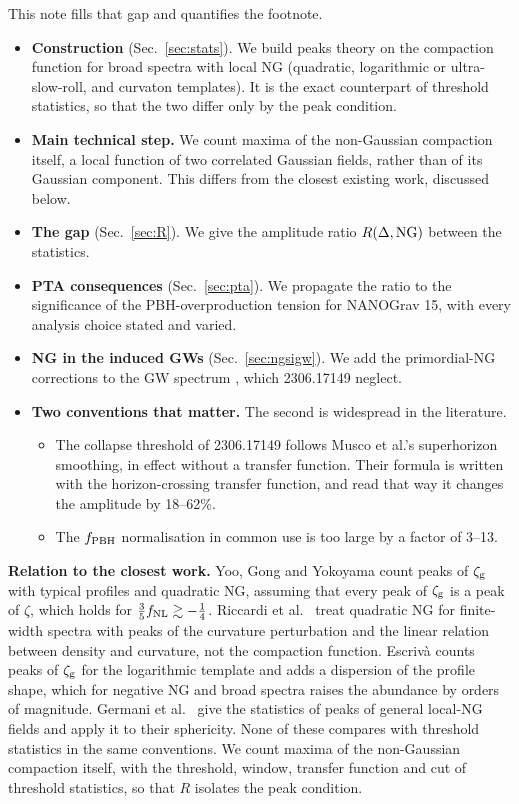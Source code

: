 \documentclass[11pt,a4paper]{article}
\newcommand{\zg}{\zeta_{\rm g}}
\newcommand{\fnl}{f_{\rm NL}}
\newcommand{\fpbh}{f_{\rm PBH}}
\begin{document}
This note fills that gap and quantifies the footnote.
\begin{itemize}
\item \textbf{Construction} (Sec.~\ref{sec:stats}). We build peaks theory on the compaction
function for broad spectra with local NG (quadratic, logarithmic or ultra-slow-roll, and
curvaton templates). It is the exact counterpart of threshold statistics, so that the two differ
only by the peak condition.
\item \textbf{Main technical step.} We count maxima of the non-Gaussian compaction itself, a local
function of two correlated Gaussian fields, rather than of its Gaussian component. This differs
from the closest existing work, discussed below.
\item \textbf{The gap} (Sec.~\ref{sec:R}). We give the amplitude ratio $R(\Delta,{\rm NG})$ between
the statistics.
\item \textbf{PTA consequences} (Sec.~\ref{sec:pta}). We propagate the ratio to the significance
of the PBH-overproduction tension for NANOGrav 15, with every analysis choice stated and varied.
\item \textbf{NG in the induced GWs} (Sec.~\ref{sec:ngsigw}). We add the primordial-NG corrections to
the GW spectrum \cite{CPS19,Unal19,ALW21}, which 2306.17149 neglect.
\item \textbf{Two conventions that matter.} The second is widespread in the literature.
  \begin{itemize}
  \item The collapse threshold of 2306.17149 follows Musco et al.'s superhorizon smoothing, in
  effect without a transfer function. Their formula is written with the horizon-crossing transfer
  function, and read that way it changes the amplitude by 18--62\%.
  \item The $\fpbh$ normalisation in common use is too large by a factor of 3--13.
  \end{itemize}
\end{itemize}

\textbf{Relation to the closest work.} Yoo, Gong and Yokoyama \cite{YGY19} count peaks of $\zg$
with typical profiles and quadratic NG, assuming that every peak of $\zg$ is a peak of $\zeta$,
which holds for $\frac35\fnl\gtrsim-\frac14$. Riccardi et al.\ \cite{Riccardi} treat quadratic NG
for finite-width spectra with peaks of the curvature perturbation and the linear relation between
density and curvature, not the compaction function. Escriv\`a \cite{Escriva26} counts peaks of
$\zg$ for the logarithmic template and adds a dispersion of the profile shape, which for negative
NG and broad spectra raises the abundance by orders of magnitude. Germani et al.\ \cite{Germani25}
give the statistics of peaks of general local-NG fields and apply it to their sphericity. None of
these compares with threshold statistics in the same conventions. We count maxima of the
non-Gaussian compaction itself, with the threshold, window, transfer function and cut of threshold
statistics, so that $R$ isolates the peak condition.
\end{document}
